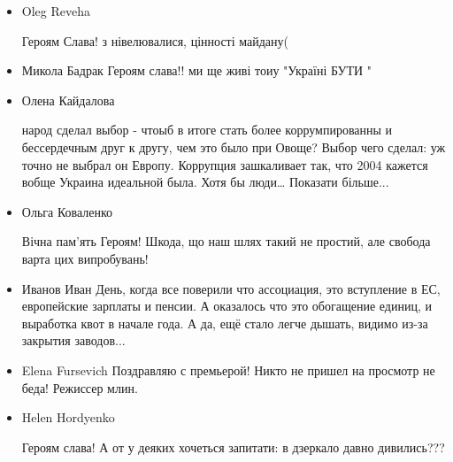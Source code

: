 \begin{itemize}
\item Oleg Reveha

Героям Слава!
з нівелювалися, цінності майдану(

\item Микола Бадрак
Героям слава!! ми ще живі тоиу "Україні БУТИ "

\item Олена Кайдалова

народ сделал выбор - чтоыб в итоге стать более коррумпированны и бессердечным
друг к другу, чем это было при Овоще? Выбор чего сделал: уж точно не выбрал он
Европу. Коррупция зашкаливает так, что 2004 кажется вобще Украина идеальной
была. Хотя бы люди… Показати більше...

\item Ольга Коваленко

Вічна пам'ять Героям! Шкода, що наш шлях такий не простий, але свобода варта цих випробувань!

\item Иванов Иван
День, когда все поверили что ассоциация, это вступление в ЕС, европейские зарплаты и пенсии. А оказалось что это обогащение единиц, и выработка квот в начале года. А да, ещё стало легче дышать, видимо из-за закрытия заводов...

\item Elena Fursevich
Поздравляю с премьерой! Никто не пришел на просмотр не беда! Режиссер млин.

\item Helen Hordyenko

Героям слава! А от у деяких хочеться запитати: в дзеркало давно дивились???
\end{itemize}

